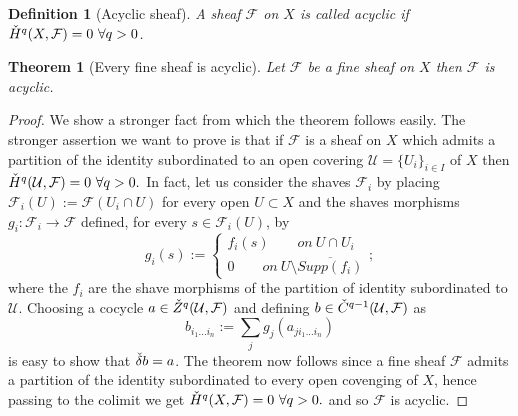 \documentclass[a4paper,12pt]{article}
\newtheorem{Theorem}{Theorem}[section]
\newtheorem{Definition}{Definition}[section]
\begin{document}
\begin{Definition}[Acyclic sheaf]
    A sheaf $\mathcal{F}$ on $X$ is called acyclic if $\Check{H}^q(X,\mathcal{F})=0 \ \forall q>0$.
\end{Definition}
\begin{Theorem}[Every fine sheaf is acyclic]
    Let $\mathcal{F}$ be a fine sheaf on $X$ then $\mathcal{F} $ is acyclic.
\end{Theorem}
\begin{proof}
    We show a stronger fact from which the theorem follows easily. The stronger assertion we want to prove is that if $\mathcal{F}$ is a sheaf on $X$ which admits a partition of the identity subordinated to an open covering $\mathcal{U}=\{U_i\}_{i \in I}$ of $X$ then $\Check{H}^q(\mathcal{U},\mathcal{F})=0 \ \forall q>0.$ In fact, let us consider the shaves $\mathcal{F}_i$ by placing $\mathcal{F}_i(U):=\mathcal{F}(U_i \cap U)$ for every open $U \subset X$ and the shaves morphisms $g_i: \mathcal{F}_i \rightarrow \mathcal{F}$ defined, for every $s \in \mathcal{F}_i(U)$, by 
    \begin{equation}
        g_i(s):=
        \begin{cases}
             f_i(s) \qquad on \ U \cap U_i\\
             0  \qquad on \ U\setminus \overline{Supp(f_i)}
        \end{cases};
    \end{equation}
where the $f_i$ are the shave morphisms of the partition of identity subordinated to $\mathcal{U}$. Choosing a cocycle $a \in \Check{Z}^q(\mathcal{U},\mathcal{F})$ and defining $b \in \Check{C}^{q-1}(\mathcal{U},\mathcal{F})$ as 
\begin{equation}
    b_{i_1...i_n}:=\sum_jg_j(a_{ji_1...i_n})
\end{equation}
is easy to show that $\Check{\delta}b=a$. The theorem now follows since a fine sheaf $\mathcal{F}$ admits a partition of the identity subordinated to every open covenging of $X$, hence passing to the colimit we get $\Check{H}^q(X,\mathcal{F})=0 \ \forall q>0.$ and so $\mathcal{F}$ is acyclic. 
\end{proof}
\end{document}
